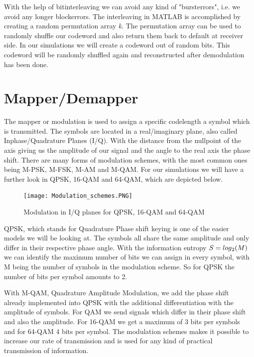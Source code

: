 \documentclass[12pt,oneside, reqno]{report}
\begin{document}
With the help of bitinterleaving we can avoid any kind of "bursterrors", i.e. we avoid any longer blockerrors. The interleaving in MATLAB is accomplished by creating a random permutation array \textit{k}. The permutation array can be used to randomly shuffle our codeword and also return them back to default at receiver side. In our simulations we will create a codeword out of random bits. This codeword will be randomly shuffled again and reconstructed after demodulation has been done. 

\newpage

\section{Mapper/Demapper}
\label{sec:mod}

The mapper or modulation is used to assign a specific codelength a symbol which is transmitted. The symbols are located in a real/imaginary plane, also called Inphase/Quadrature Planes (I/Q). With the distance from the nullpoint of the axis giving us the amplitude of our signal and the angle to the real axis the phase shift. 
There are many forms of modulation schemes, with the most common ones being M-PSK, M-FSK, M-AM and M-QAM. For our simulations we will have a further look in QPSK, 16-QAM and 64-QAM, which are depicted below.

\begin{figure}[H]
	\centering
	\texttt{[image: Modulation\_schemes.PNG]}
	\caption{Modulation in I/Q planes for QPSK, 16-QAM and 64-QAM}
	\label{fig:Modulation}
\end{figure}

QPSK, which stands for Quadrature Phase shift keying is one of the easier models we will be looking at. The symbols all share the same amplitude and only differ in their respective phase angle. With the information entropy $S = log\textsubscript{2}(M)$ we can identify the maximum number of bits we can assign in every symbol, with M being the number of symbols in the modulation scheme. So for QPSK the number of bits per symbol amounts to 2.

With M-QAM, Quadrature Amplitude Modulation, we add the phase shift already implemented into QPSK with the additional differentiation with the amplitude of symbols. For QAM we send signals which differ in their phase shift and also the amplitude.  For 16-QAM we get a maximum of 3 bits per symbols and for 64-QAM 4 bits per symbol.
The modulation schemes makes it possible to increase our rate of transmission and is used for any kind of practical transmission of information.
\end{document}
